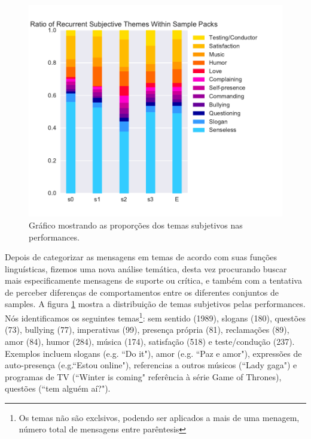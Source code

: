 \begin{figure}[ht!]

\includegraphics[width=1\linewidth]{pictures/cap3/subj_themes}
\caption{Gráfico mostrando as proporções dos temas subjetivos nas performances.}
\label{subj}
\end{figure}



Depois de categorizar as mensagens em temas de acordo com suas funções linguísticas, fizemos uma nova análise temática, desta vez procurando buscar mais especificamente mensagens de suporte ou crítica, e também com a tentativa de perceber diferenças de comportamentos entre os diferentes conjuntos de samples. A figura \ref{subj} mostra a distribuição de temas subjetivos pelas performances. Nós identificamos os seguintes temas\footnote{Os temas não são exclsivos, podendo ser aplicados a mais de uma menagem, número total de mensagens entre parêntesis}: sem sentido (1989), slogans (180), questões (73), bullying (77), imperativas (99), presença própria (81), reclamações (89), amor (84), humor (284), música (174), satisfação (518) e teste/condução (237). Exemplos incluem slogans (e.g. ``Do it"), amor (e.g. ``Paz e amor"), expressões de auto-presença (e.g.``Estou online"), referencias a outros músicos (``Lady gaga") e programas de TV (``Winter is coming" referência à série Game of Thrones), questões (``tem alguém aí?"). 

